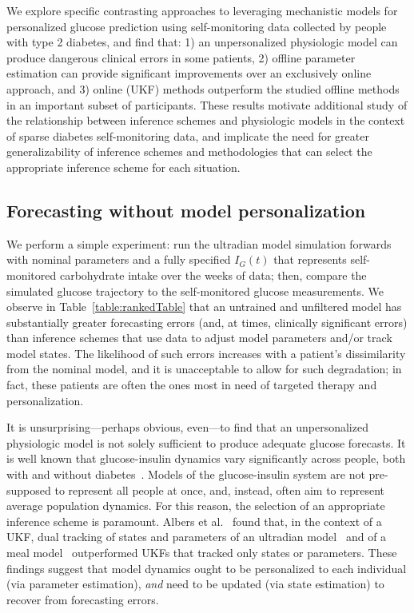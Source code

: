 \documentclass[10pt,letterpaper]{article}
\begin{document}
We explore specific contrasting approaches to leveraging mechanistic models for personalized glucose prediction using self-monitoring data collected by people with type 2 diabetes, and find that: 1) an unpersonalized physiologic model can produce dangerous clinical errors in some patients, 2) offline parameter estimation can provide significant improvements over an exclusively online approach, and 3) online (UKF) methods outperform the studied offline methods in an important subset of participants. These results motivate additional study of the relationship between inference schemes and physiologic models in the context of sparse diabetes self-monitoring data, and implicate the need for greater generalizability of inference schemes and methodologies that can select the appropriate inference scheme for each situation.

\subsection{Forecasting without model personalization}
We perform a simple experiment: run the ultradian model simulation forwards with nominal parameters and a fully specified $I_G(t)$ that represents self-monitored carbohydrate intake over the weeks of data; then, compare the simulated glucose trajectory to the self-monitored glucose measurements.
We observe in Table~\ref{table:rankedTable} that an untrained and unfiltered model has substantially greater forecasting errors (and, at times, clinically significant errors) than inference schemes that use data to adjust model parameters and/or track model states. The likelihood of such errors increases with a patient's dissimilarity from the nominal model, and it is unacceptable to allow for such degradation; in fact, these patients are often the ones most in need of targeted therapy and personalization.

It is unsurprising---perhaps obvious, even---to find that an unpersonalized physiologic model is not solely sufficient to produce adequate glucose forecasts. It is well known that glucose-insulin dynamics vary significantly across people, both with and without diabetes~\cite{zeevi_personalized_2015}. Models of the glucose-insulin system are not pre-supposed to represent all people at once, and, instead, often aim to represent average population dynamics. For this reason, the selection of an appropriate inference scheme is paramount. Albers et al.~\cite{albers_personalized_2017} found that, in the context of a UKF, dual tracking of states and parameters of an ultradian model~\cite{sturisUltradian} and of a meal model~\cite{dalla_man} outperformed UKFs that tracked only states or parameters. These findings suggest that model dynamics ought to be personalized to each individual (via parameter estimation), \emph{and} need to be updated (via state estimation) to recover from forecasting errors.
\end{document}
